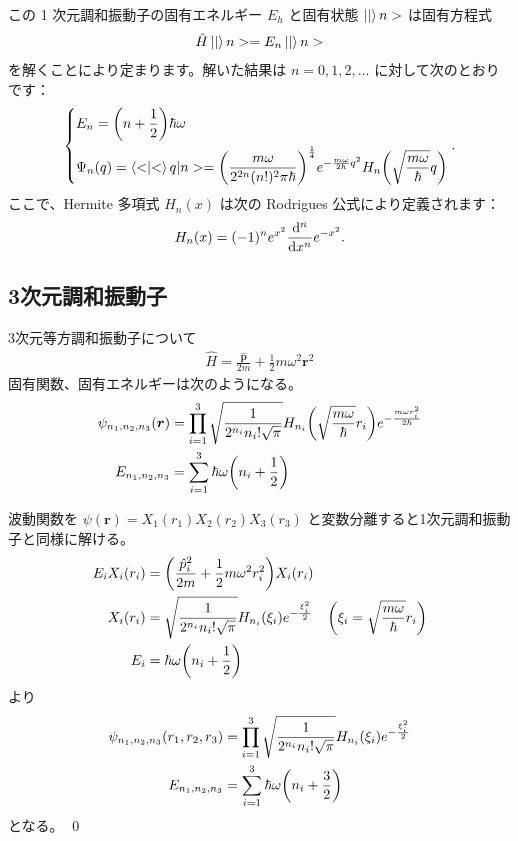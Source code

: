 \documentclass[uplatex,dvipdfmx,a4paper,11pt]{jlreq}
\makeatletter
\newcommand{\rr}{\bm{r}}
\newcommand{\pp}{\bm{p}}
\numberwithin{equation}{section}
\theoremstyle{definition}
\renewenvironment{proof}[1][\proofname]{\par
  \normalfont
  \topsep6\p@\@plus6\p@ \trivlist
  \item[\hskip\labelsep{\bfseries #1}\@addpunct{\bfseries}]\ignorespaces\quad\par
}{%
  \qed\endtrivlist\@endpefalse
}
\renewcommand\proofname{証明}
\makeatother
\begin{document}
この 1 次元調和振動子の固有エネルギー $E_h$ と固有状態 $\ket|n>$ は固有方程式
\begin{align}
  \hat{H}\ket|n> = E_n\ket|n>
\end{align}
を解くことにより定まります。解いた結果は $n = 0, 1, 2, \ldots$ に対して次のとおりです：
\begin{align}
  \begin{dcases}
    E_n        = \qty(n + \frac{1}{2})\hbar\omega \\
    \Psi_n(q) = \braket<q|n> = \qty(\frac{m\omega}{2^{2n}(n!)^2\pi\hbar})^{\frac{1}{4}}e^{-\frac{m\omega}{2\hbar}q^2}H_n\qty(\sqrt{\frac{m\omega}{\hbar}}q)
  \end{dcases}.
\end{align}
ここで、Hermite 多項式 $H_n(x)$ は次の Rodrigues 公式により定義されます：
\begin{align}
  H_n(x) = (-1)^ne^{x^2}\dv[n]{x}e^{-x^2}.
\end{align}

\subsection{3次元調和振動子}
\begin{proposition}
  3次元等方調和振動子について
  \begin{align}
    \hat{H} = \frac{\hat{\pp}}{2m} + \frac{1}{2}m\omega^2\rr^2
  \end{align}
  固有関数、固有エネルギーは次のようになる。
  \begin{align}
    \psi_{n_1,n_2,n_3}(\rr) & = \prod_{i = 1}^3\sqrt{\frac{1}{2^{n_i}n_i!\sqrt{\pi}}}H_{n_i}\qty(\sqrt{\frac{m\omega}{\hbar}}r_i)e^{-\frac{m\omega r_i^2}{2\hbar}} \\
    E_{n_1,n_2,n_3}         & = \sum_{i=1}^{3}\hbar\omega\qty(n_i + \frac{1}{2})
  \end{align}
\end{proposition}
\begin{proof}
  波動関数を $\psi(\rr) = X_1(r_1)X_2(r_2)X_3(r_3)$ と変数分離すると1次元調和振動子と同様に解ける。
  \begin{align}
    E_iX_i(r_i) & = \qty(\frac{\hat{p}_i^2}{2m} + \frac{1}{2}m\omega^2r_i^2)X_i(r_i)                                                           \\
    X_i(r_i)    & = \sqrt{\frac{1}{2^{n_i}n_i!\sqrt{\pi}}}H_{n_i}(\xi_i)e^{-\frac{\xi_i^2}{2}} & \qty(\xi_i = \sqrt{\frac{m\omega}{\hbar}}r_i) \\
    E_i         & = \hbar\omega\qty(n_i + \frac{1}{2})
  \end{align}
  より
  \begin{align}
    \psi_{n_1,n_2,n_3}(r_1,r_2,r_3) & = \prod_{i = 1}^3\sqrt{\frac{1}{2^{n_i}n_i!\sqrt{\pi}}}H_{n_i}(\xi_i)e^{-\frac{\xi_i^2}{2}} \\
    E_{n_1,n_2,n_3}                 & = \sum_{i=1}^{3}\hbar\omega\qty(n_i + \frac{3}{2})
  \end{align}
  となる。
\end{proof}
\end{document}
